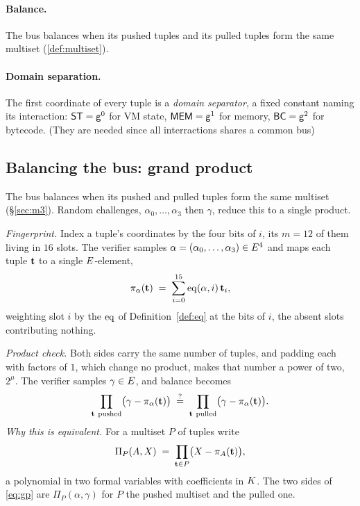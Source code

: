 \paragraph{Balance.} The bus balances when its pushed tuples and its pulled tuples form the same multiset (\ref{def:multiset}).

\paragraph{Domain separation.} The first coordinate of every tuple is a \emph{domain separator}, a fixed constant naming its interaction: $\mathsf{ST}=\mathsf{g}^{0}$ for VM state, $\mathsf{MEM}=\mathsf{g}^{1}$ for memory, $\mathsf{BC}=\mathsf{g}^{2}$ for bytecode. (They are needed since all interractions shares a common bus)

\subsection{Balancing the bus: grand product}\label{sec:gp}

The bus balances when its pushed and pulled tuples form the same multiset (\S\ref{sec:m3}). Random challenges, $\alpha_0,\dots,\alpha_3$ then $\gamma$, reduce this to a single product.

\emph{Fingerprint.} Index a tuple's coordinates by the four bits of $i$, its $m=12$ of them living in $16$ slots. The verifier samples $\alpha=(\alpha_0,\dots,\alpha_3)\in E^{4}$ and maps each tuple $\mathbf{t}$ to a single $E$-element,
\[
\pi_\alpha(\mathbf{t})\;=\;\sum_{i=0}^{15}\operatorname{eq}(\alpha,i)\,\mathbf{t}_i ,
\]
weighting slot $i$ by the $\operatorname{eq}$ of Definition~\ref{def:eq} at the bits of $i$, the absent slots contributing nothing.

\emph{Product check.} Both sides carry the same number of tuples, and padding each with factors of $1$, which change no product, makes that number a power of two, $2^{\mu}$. The verifier samples $\gamma\in E$, and balance becomes
\begin{equation}
\prod_{\btup\ \text{pushed}}\bigl(\gamma-\pi_\alpha(\btup)\bigr)
\;\qeq\;
\prod_{\btup\ \text{pulled}}\bigl(\gamma-\pi_\alpha(\btup)\bigr).
\label{eq:gp}
\end{equation}
\emph{Why this is equivalent.} For a multiset $P$ of tuples write
\[
  \Pi_P(A,X)\;=\;\prod_{\mathbf{t}\in P}\bigl(X-\pi_A(\mathbf{t})\bigr),
\]
a polynomial in two formal variables with coefficients in $K$. The two sides of \eqref{eq:gp} are $\Pi_P(\alpha,\gamma)$ for $P$ the pushed multiset and the pulled one.

